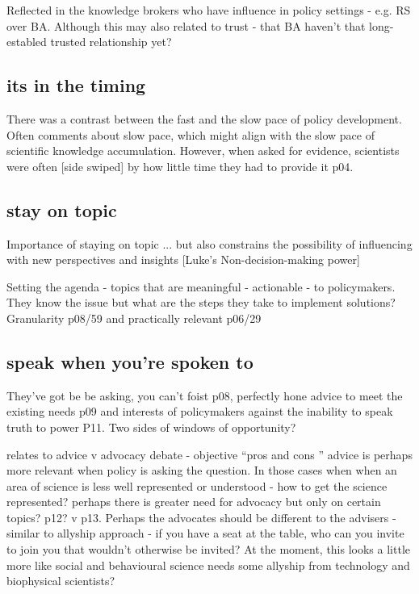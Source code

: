Reflected in the knowledge brokers who have influence in policy settings - e.g. RS over BA. Although this may also related to trust - that BA haven't that long-establed trusted relationship yet?

\subsection{its in the timing}
There was a contrast between the fast and the slow pace of policy development. Often comments about slow pace, which might align with the slow pace of scientific knowledge accumulation. However, when asked for evidence, scientists were often [side swiped] by how little time they had to provide it p04.  

\subsection{stay on topic}
Importance of staying on topic ... but also constrains the possibility of influencing with new perspectives and insights [Luke's Non-decision-making power]

Setting the agenda - topics that are meaningful - actionable - to policymakers. They know the issue but what are the steps they take to implement solutions? Granularity p08/59 and practically relevant p06/29


\subsection{speak when you're spoken to}
They've got be be asking, you can't foist p08, perfectly hone advice to meet the existing needs p09 and interests of policymakers against the inability to speak truth to power P11. Two sides of windows of opportunity?

relates to advice v advocacy debate - objective ``pros and cons '' advice is perhaps more relevant when policy is asking the question. In those cases when when an area of science is less well represented or understood - how to get the science represented? perhaps there is greater need for advocacy but only on certain topics? p12? v p13. Perhaps the advocates should be different to the advisers - similar to allyship approach - if you have a seat at the table, who can you invite to join you that wouldn't otherwise be invited? At the moment, this looks a little more like social and behavioural science needs some allyship from technology and biophysical scientists?





